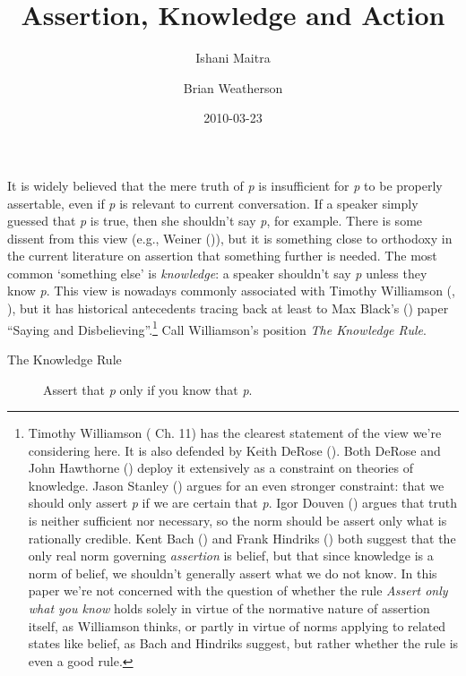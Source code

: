 \documentclass[
  11pt,
  letterpaper,
  DIV=11,
  numbers=noendperiod]{scrartcl}
\title{Assertion, Knowledge and Action}
\author{Ishani Maitra \and Brian Weatherson}
\date{2010-03-23}
\begin{document}
\maketitle
It is widely believed that the mere truth of \emph{p} is insufficient
for \emph{p} to be properly assertable, even if \emph{p} is relevant to
current conversation. If a speaker simply guessed that \emph{p} is true,
then she shouldn't say \emph{p}, for example. There is some dissent from
this view (e.g., Weiner ()), but it is
something close to orthodoxy in the current literature on assertion that
something further is needed. The most common `something else' is
\emph{knowledge}: a speaker shouldn't say \emph{p} unless they know
\emph{p}. This view is nowadays commonly associated with Timothy
Williamson (,
), but it has historical
antecedents tracing back at least to Max Black's
() paper ``Saying and
Disbelieving''.\footnote{Timothy Williamson
  ( Ch. 11) has the
  clearest statement of the view we're considering here. It is also
  defended by Keith DeRose (). Both
  DeRose and John Hawthorne () deploy
  it extensively as a constraint on theories of knowledge. Jason Stanley
  () argues for an even stronger
  constraint: that we should only assert \emph{p} if we are certain that
  \emph{p}. Igor Douven () argues that
  truth is neither sufficient nor necessary, so the norm should be
  assert only what is rationally credible. Kent Bach
  () and Frank Hindriks
  () both suggest that the only real
  norm governing \emph{assertion} is belief, but that since knowledge is
  a norm of belief, we shouldn't generally assert what we do not know.
  In this paper we're not concerned with the question of whether the
  rule \emph{Assert only what you know} holds solely in virtue of the
  normative nature of assertion itself, as Williamson thinks, or partly
  in virtue of norms applying to related states like belief, as Bach and
  Hindriks suggest, but rather whether the rule is even a good rule.}
Call Williamson's position \emph{The Knowledge Rule}.

\begin{description}
\item[The Knowledge Rule]
Assert that \emph{p} only if you know that \emph{p}.
\end{description}
\end{document}

